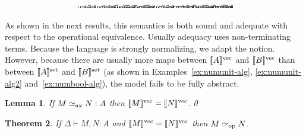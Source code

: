 \documentclass[10pt]{article}
\theoremstyle{plain}
\newtheorem{theorem}{Theorem}
\newtheorem{lemma}[theorem]{Lemma}
\theoremstyle{definition}
\newcommand{\entail}{\vdash}
\newcommand{\opeq}{\mathrel{\simeq_{\rm op}}}
\newcommand{\axeq}{\mathrel{\simeq_{\rm ax}}}
\newcommand{\fsdenot}[1]{{[\![{#1}]\!]^{\rm set}}}
\newcommand{\fvdenot}[1]{{[\![{#1}]\!]^{\rm vec}}}
\begin{document}
\begin{table*}[b]
{\begin{minipage}{5.32in}
\[\begin{array}{@{}r@{}}
\begin{array}{@{}l@{}}
\a\a\a\a\a\a\a\a\a\a\a\a\a\a\a\b\a\a\a\a\b\b\b\b\a\a\a\a\a\b\a\b\a\a\a\a \a\a\a\a\a\a\a\a\a\b\a\b\a\a\a\a\a\b\b\b\a\a\a\a\a\b\a\b\b\b\b\b\a\a\a\a \a\a\a\a\a\b\a\b\b\b\b\b\b\b\b\b\a\a\a\a\b\b\a\b\b\b\b\b\a\a\a\a\a\a\a\a \a\b\a\b\b\b\b\b\b\b\b\b\a\a\a\a\a\b\a\b\a\a\a\a\a\a\a\a\a\a\a\a\a\b\a\b \a\a\a\a\b\b\b\b\a\a\a\a\a\b\a\b\a\a\a\a\a\a\a\a\a\a\a\a\a\b\a\b\a\a\a\a \b\b\b\b\a\a\a\a\a\b\a\b\b\b\b\b\a\a\a\b\a\a\a\a\a\b\a\b\b\b\b\b\b\b\b\b \a\a\a\a\a\b\a\b\b\b\b\b\a\a\a\a\a\a\a\a\a\b\a\b\b\b\b\b\b\b\b\b\a\a\a\a \a\b\a\b\mynl
\a\a\a\b\a\a\a\b\a\a\b\b\a\a\b\b\a\a\a\b\a\a\a\b\a\a\b\b\a\a\b\b\a\a\a\b \a\b\a\b\a\b\b\b\a\b\b\b\a\b\a\b\a\b\a\b\a\b\b\b\a\b\b\b\a\a\a\b\a\a\a\b \a\a\b\b\a\a\b\b\a\a\a\b\a\a\a\b\a\a\b\b\a\a\b\b\a\b\a\b\a\b\a\b\b\b\b\b \a\b\b\b\a\b\a\b\a\b\a\b\a\b\b\b\a\b\b\b\b\a\a\b\b\a\a\b\b\b\b\b\b\a\b\b \b\a\a\b\a\a\a\b\b\a\b\b\b\a\b\b\b\b\a\b\b\b\a\b\b\b\b\b\b\b\b\b\b\b\a\b \b\b\a\b\b\b\b\b\b\b\b\b\b\a\a\b\b\a\a\b\b\a\b\b\b\a\b\b\b\a\a\b\b\a\a\b \b\a\b\b\b\a\b\b\b\b\a\b\b\b\a\b\b\b\b\b\b\b\b\b\b\b\a\b\b\b\a\b\b\b\b\b \b\b\b\b\mynl
\a\a\a\b\a\a\a\b\a\a\a\b\a\a\b\b\a\b\a\b\a\b\b\b\a\b\a\b\a\b\b\b\a\a\a\b \a\a\b\b\a\a\a\b\a\a\b\b\a\b\a\b\a\b\b\b\a\b\a\b\a\b\b\b\b\a\a\b\b\a\b\b \b\a\a\b\b\a\b\b\b\b\b\b\b\b\b\b\b\b\a\b\b\b\b\b\b\a\a\b\b\a\b\b\a\a\a\b \b\a\b\b\b\b\a\b\b\b\b\b\b\b\a\b\b\b\b\b\a\a\a\b\a\a\b\b\a\a\a\b\a\a\b\b \a\b\a\b\b\b\b\b\a\b\a\b\a\b\b\b\a\a\a\b\a\a\b\b\a\a\a\b\a\a\b\b\a\b\a\b \a\b\b\b\a\b\a\b\a\b\b\b\b\a\a\b\b\a\b\b\b\a\a\b\b\a\b\b\b\b\a\b\b\b\b\b \b\b\a\b\b\b\b\b\b\a\a\b\b\a\b\b\b\a\a\b\b\a\b\b\b\b\a\b\b\b\b\b\b\b\a\b \b\b\b\b
\end{array}
\end{array}
\]
 \end{minipage}}
\end{table*}

As shown in the next results, this semantics is both sound and
adequate with respect to the operational equivalence.
Usually adequacy uses non-terminating terms. Because the
language is strongly normalizing, we adapt the notion.
However, because there are usually more maps between $\fvdenot{A}$ and
$\fvdenot{B}$ than between $\fsdenot{A}$ and $\fsdenot{B}$ (as shown
in Examples~\ref{ex:numunit-alg}, \ref{ex:numunit-alg2}
and~\ref{ex:numbool-alg}), the model fails to be fully abstract.

\begin{lemma}
  \label{lem:axdenot-st-alg}
  If $M\axeq N:A$ then $\fvdenot{M} =
  \fvdenot{N}$.\qed
\end{lemma}


\begin{theorem}
  \label{th:sound-st-alg}
  If $\Delta\entail M,N:A$ and $\fvdenot{M}=\fvdenot{N}$ then 
  $M\opeq N$.
\end{theorem}
\end{document}
